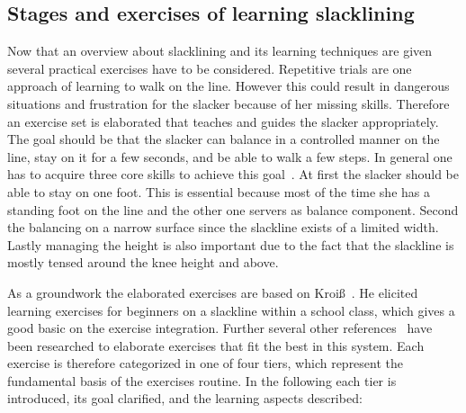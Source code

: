 \subsection{Stages and exercises of learning slacklining}\label{3_3_2_StagesExercises}
Now that an overview about slacklining and its learning techniques are given several practical exercises have to be considered. Repetitive trials are one approach of learning to walk on the line. However this could result in dangerous situations and frustration for the slacker because of her missing skills. Therefore an exercise set is elaborated that teaches and guides the slacker appropriately. The goal should be that the slacker can balance in a controlled manner on the line, stay on it for a few seconds, and be able to walk a few steps. In general one has to acquire three core skills to achieve this goal~\cite{Kroiss2007-ab}. At first the slacker should be able to stay on one foot. This is essential because most of the time she has a standing foot on the line and the other one servers as balance component. Second the balancing on a narrow surface since the slackline exists of a limited width. Lastly managing the height is also important due to the fact that the slackline is mostly tensed around the knee height and above.

As a groundwork the elaborated exercises are based on Kroiß~\cite{Kroiss2007-ab}. He elicited learning exercises for beginners on a slackline within a school class, which gives a good basic on the exercise integration. Further several other references~\cite{Balcom2005-wl, Donath2013-kk, Donath2016-gm, Granacher2010-ow, Keller2012-xh, Kleindl2011-bl, Pfusterschmied2013-yy, Thomann2013-aa} have been researched to elaborate exercises that fit the best in this system. Each exercise is therefore categorized in one of four tiers, which represent the fundamental basis of the exercises routine. In the following each tier is introduced, its goal clarified, and the learning aspects described:

